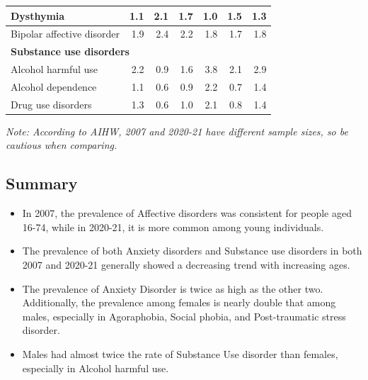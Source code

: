 \documentclass[
  a4paper,
  DIV=11,
  numbers=noendperiod]{scrreport}
\begin{document}
\begin{table}
\begin{tabular}[t]{l|>{}r|>{}r|r|>{}r|>{}r|r}
\hline
\hspace{1em}Dysthymia & \textcolor[HTML]{2196F3}{1.1} & \textcolor[HTML]{F44336}{2.1} & 1.7 & \textcolor[HTML]{2196F3}{1.0} & \textcolor[HTML]{F44336}{1.5} & 1.3\\
\hline
\hspace{1em}Bipolar affective disorder & \textcolor[HTML]{2196F3}{1.9} & \textcolor[HTML]{F44336}{2.4} & 2.2 & \textcolor[HTML]{2196F3}{1.8} & \textcolor[HTML]{F44336}{1.7} & 1.8\\
\hline
\multicolumn{7}{l}{\textbf{Substance use disorders}}\\
\hline
\hspace{1em}Alcohol harmful use & \textcolor[HTML]{2196F3}{2.2} & \textcolor[HTML]{F44336}{0.9} & 1.6 & \textcolor[HTML]{2196F3}{3.8} & \textcolor[HTML]{F44336}{2.1} & 2.9\\
\hline
\hspace{1em}Alcohol dependence & \textcolor[HTML]{2196F3}{1.1} & \textcolor[HTML]{F44336}{0.6} & 0.9 & \textcolor[HTML]{2196F3}{2.2} & \textcolor[HTML]{F44336}{0.7} & 1.4\\
\hline
\hspace{1em}Drug use disorders & \textcolor[HTML]{2196F3}{1.3} & \textcolor[HTML]{F44336}{0.6} & 1.0 & \textcolor[HTML]{2196F3}{2.1} & \textcolor[HTML]{F44336}{0.8} & 1.4\\
\hline
\end{tabular}
\end{table}

\emph{Note: According to AIHW, 2007 and 2020-21 have different sample
sizes, so be cautious when comparing.}

\hypertarget{summary-1}{%
\subsection{Summary}\label{summary-1}}

\begin{itemize}
\item
  In 2007, the prevalence of Affective disorders was consistent for
  people aged 16-74, while in 2020-21, it is more common among young
  individuals.
\item
  The prevalence of both Anxiety disorders and Substance use disorders
  in both 2007 and 2020-21 generally showed a decreasing trend with
  increasing ages.
\item
  The prevalence of Anxiety Disorder is twice as high as the other two.
  Additionally, the prevalence among females is nearly double that among
  males, especially in Agoraphobia, Social phobia, and Post-traumatic
  stress disorder.
\item
  Males had almost twice the rate of Substance Use disorder than
  females, especially in Alcohol harmful use.
\end{itemize}
\end{document}
